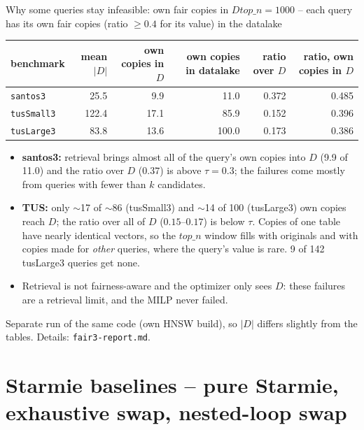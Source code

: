 \documentclass[aspectratio=169,10pt]{beamer}
\newcommand{\highlight}[1]{{\color{Cat1}\bfseries #1}}
\begin{document}
\begin{frame}{Why some queries stay infeasible: own fair copies in $D$}{$top\_n{=}1000$ -- each query has its own fair copies (ratio $\ge0.4$ for its value) in the datalake}
\small
\begin{center}
\setlength{\tabcolsep}{4pt}
\begin{tabular}{lrrrrr}
\toprule
benchmark & mean $|D|$ & own copies in $D$ & own copies in datalake & ratio over $D$ & ratio, own copies in $D$ \\
\midrule
\texttt{santos3} & 25.5 & 9.9 & 11.0 & 0.372 & 0.485 \\
\texttt{tusSmall3} & 122.4 & 17.1 & 85.9 & 0.152 & 0.396 \\
\texttt{tusLarge3} & 83.8 & 13.6 & 100.0 & 0.173 & 0.386 \\
\bottomrule
\end{tabular}
\end{center}
\vspace{4pt}
\begin{itemize}\setlength\itemsep{3pt}
\item \highlight{santos3:} retrieval brings almost all of the query's own copies into $D$ (9.9 of 11.0) and the ratio over $D$ ($0.37$) is above $\tau{=}0.3$; the failures come mostly from queries with fewer than $k$ candidates.
\item \highlight{TUS:} only $\sim$17 of $\sim$86 (tusSmall3) and $\sim$14 of 100 (tusLarge3) own copies reach $D$; the ratio over all of $D$ ($0.15$--$0.17$) is below $\tau$. Copies of one table have nearly identical vectors, so the $top\_n$ window fills with originals and with copies made for \emph{other} queries, where the query's value is rare. 9 of 142 tusLarge3 queries get none.
\item Retrieval is not fairness-aware and the optimizer only sees $D$: these failures are a retrieval limit, and the MILP never failed.
\end{itemize}
{\footnotesize\color{Muted} Separate run of the same code (own HNSW build), so $|D|$ differs slightly from the tables. Details: \texttt{fair3-report.md}.}
\end{frame}

\section{Starmie baselines -- pure Starmie, exhaustive swap, nested-loop swap}
\end{document}

